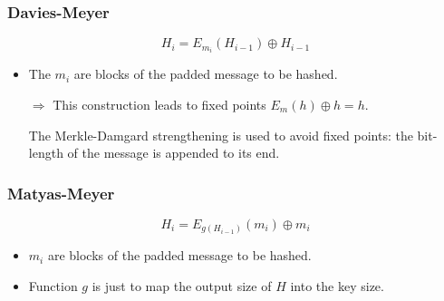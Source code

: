 \subsubsection{Davies-Meyer} 
$$H_i=E_{m_i}(H_{i-1})\oplus H_{i-1}$$ 

\begin{itemize}
    \item The $m_i$ are blocks of the padded message to be hashed. 
    \item[$\Rightarrow$] This
        construction leads to fixed points $E_m(h)\oplus h=h$.

        The Merkle-Damgard strengthening is used to avoid fixed points: the
        bit-length of the message is appended to its end.
\end{itemize}

\subsubsection{Matyas-Meyer} 
$$H_i = E_{g(H_{i-1})}(m_i)\oplus m_i$$

\begin{itemize}
    \item $m_i$ are blocks of the padded message to be hashed.
    \item Function $g$ is just to map the output size of $H$ into the key size.
\end{itemize}

